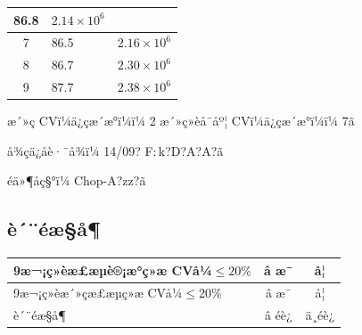 \documentclass[UTF8,10pt,a4paper,fontset=fandol]{ctexart}
\newcommand{\fieldvalue}[1]{#1}
\newcommand{\handwritten}[1]{#1}
\begin{document}
\begin{center}
\begin{tabularx}{\textwidth}{|c|X|X|}
\fieldvalue{\handwritten{86.8}} &
\fieldvalue{\handwritten{$2.14\times10^{6}$}}\\
\hline
7 &
\fieldvalue{\handwritten{86.5}} &
\fieldvalue{\handwritten{$2.16\times10^{6}$}}\\
\hline
8 &
\fieldvalue{\handwritten{86.7}} &
\fieldvalue{\handwritten{$2.30\times10^{6}$}}\\
\hline
9 &
\fieldvalue{\handwritten{87.7}} &
\fieldvalue{\handwritten{$2.38\times10^{6}$}}\\
\hline
\end{tabularx}
\end{center}

æ´»ç CVï¼ä¿çæ´æ°ï¼ï¼
\fieldvalue{\handwritten{2}}
\qquad
æ´»ç»èå¯åº¦ CVï¼ä¿çæ´æ°ï¼ï¼
\fieldvalue{\handwritten{7}}ã

å¾çä¿å­è·¯å¾ï¼
\fieldvalue{\handwritten{14/09? F:\,k?D?A?A?}}ã

éä»¶åç§°ï¼
\fieldvalue{\handwritten{Chop-A?zz?}}ã

\subsection*{è´¨éæ§å¶}

\begin{tabularx}{\textwidth}{|X|c|c|}
\hline
9æ¬¡ç»èæ£æµè®¡æ°ç»æ CVå¼$\leq20\%$ &
\fieldvalue{\handwritten{â æ¯}} & å¦\\
\hline
9æ¬¡ç»èæ´»çæ£æµç»æ CVå¼$\leq20\%$ &
\fieldvalue{\handwritten{â æ¯}} & å¦\\
\hline
è´¨éæ§å¶ &
\fieldvalue{\handwritten{â éè¿}} & ä¸éè¿\\
\hline
\end{tabularx}
\end{document}
